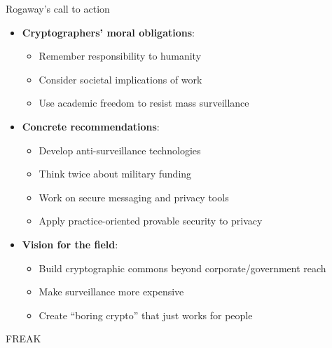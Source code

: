 \documentclass[aspectratio=169, lualatex, handout]{beamer}
\begin{document}
\begin{frame}{Rogaway's call to action}
	\begin{itemize}
		\item \textbf{Cryptographers' moral obligations}:
		      \begin{itemize}
			      \item Remember responsibility to humanity
			      \item Consider societal implications of work
			      \item Use academic freedom to resist mass surveillance
		      \end{itemize}
		\item \textbf{Concrete recommendations}:
		      \begin{itemize}
			      \item Develop anti-surveillance technologies
			      \item Think twice about military funding
			      \item Work on secure messaging and privacy tools
			      \item Apply practice-oriented provable security to privacy
		      \end{itemize}
		\item \textbf{Vision for the field}:
		      \begin{itemize}
			      \item Build cryptographic commons beyond corporate/government reach
			      \item Make surveillance more expensive
			      \item Create ``boring crypto'' that just works for people
		      \end{itemize}
	\end{itemize}
\end{frame}

\begin{frame}{FREAK}
\end{frame}
\end{document}
